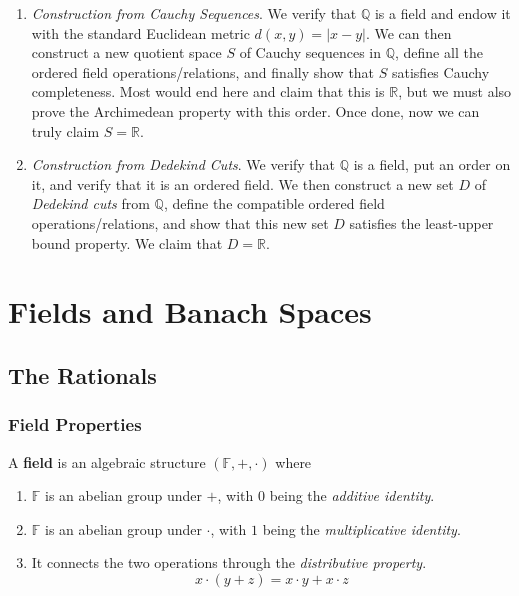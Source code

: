 \documentclass{article}
\begin{document}
  \begin{enumerate}
    \item \textit{Construction from Cauchy Sequences}. We verify that $\mathbb{Q}$ is a field and endow it with the standard Euclidean metric $d(x, y) = |x - y|$. We can then construct a new quotient space $S$ of Cauchy sequences in $\mathbb{Q}$, define all the ordered field operations/relations, and finally show that $S$ satisfies Cauchy completeness. Most would end here and claim that this is $\mathbb{R}$, but we must also prove the Archimedean property with this order. Once done, now we can truly claim $S = \mathbb{R}$. 

    \item \textit{Construction from Dedekind Cuts}. We verify that $\mathbb{Q}$ is a field, put an order on it, and verify that it is an ordered field. We then construct a new set $D$ of \textit{Dedekind cuts} from $\mathbb{Q}$, define the compatible ordered field operations/relations, and show that this new set $D$ satisfies the least-upper bound property. We claim that $D = \mathbb{R}$. 
  \end{enumerate} 

\section{Fields and Banach Spaces} 

  \subsection{The Rationals}

    \subsubsection{Field Properties}  

      \begin{definition}[Field]
        A \textbf{field} is an algebraic structure $(\mathbb{F}, +, \cdot)$ where 
        \begin{enumerate}
          \item $\mathbb{F}$ is an abelian group under $+$, with $0$ being the \textit{additive identity}. 
          \item $\mathbb{F}$ is an abelian group under $\cdot$, with $1$ being the \textit{multiplicative identity}. 
          \item It connects the two operations through the \textit{distributive property}.
          \begin{equation}
            x \cdot (y + z) = x \cdot y + x \cdot z
          \end{equation}
        \end{enumerate}
      \end{definition} 
\end{document}
